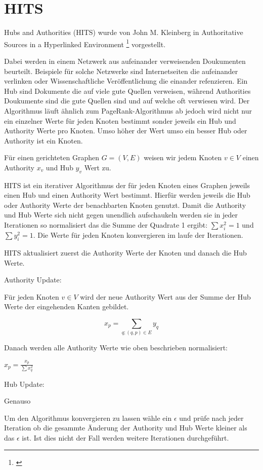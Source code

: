 \section{HITS}

Hubs and Authorities (HITS) wurde von John M. Kleinberg in Authoritative Sources in a Hyperlinked Environment \footnote{\cite{Kleinberg98authoritativesources}} vorgestellt.

Dabei werden in einem Netzwerk aus aufeinander verweisenden Doukumenten beurteilt. Beispiele für solche Netzwerke sind Internetseiten die aufeinander
verlinken oder Wissenschaftliche Veröffentlichung die einander refenzieren. Ein Hub sind Dokumente die auf viele gute Quellen verweisen, während
Authorities Doukumente sind die gute Quellen sind und auf welche oft verwiesen wird. Der Algorithmus läuft ähnlich zum PageRank-Algorithmus ab 
jedoch wird nicht nur ein einzelner Werte für jeden Knoten bestimmt sonder jeweils ein Hub und Authority Werte pro Knoten. Umso höher der Wert umso
ein besser Hub oder Authority ist ein Knoten.

Für einen gerichteten Graphen $G = (V, E)$ weisen wir jedem Knoten $v \in V$ einen Authority $x_{v}$ und Hub $y_{v}$ Wert zu.

HITS ist ein iterativer Algorithmus der für jeden Knoten eines Graphen jeweils einen Hub und einen Authority Wert bestimmt. Hierfür 
werden jeweils die Hub oder Authority Werte der benachbarten Knoten genutzt. Damit die Authority und Hub Werte sich nicht gegen
unendlich aufschaukeln werden sie in jeder Iterationen so normalisiert das die Summe der Quadrate 1 ergibt:
$ \sum x_{i}^{2} = 1 $ und $ \sum y_{i}^{2} = 1$.
Die Werte für jeden Knoten konvergieren im laufe der Iterationen.

HITS aktualisiert zuerst die Authority Werte der Knoten und danach die Hub Werte.

Authority Update:

Für jeden Knoten $ v \in V $ wird der neue Authority Wert aus der Summe der Hub Werte der eingehenden Kanten gebildet.

\[ x_{p} = \sum_{q; (q, p) \in E} y_{q} \]


Danach werden alle Authority Werte wie oben beschrieben normalisiert:

$ x_{p} =  \frac{x_{p}}{\sum x_{q}^{2}} $

Hub Update:

Genauso


Um den Algorithmus konvergieren zu lassen wähle ein $ \epsilon $ und prüfe nach jeder Iteration ob die gesammte Änderung der Authority
und Hub Werte kleiner als das $ \epsilon $ ist. Ist dies nicht der Fall werden weitere Iterationen durchgeführt.
